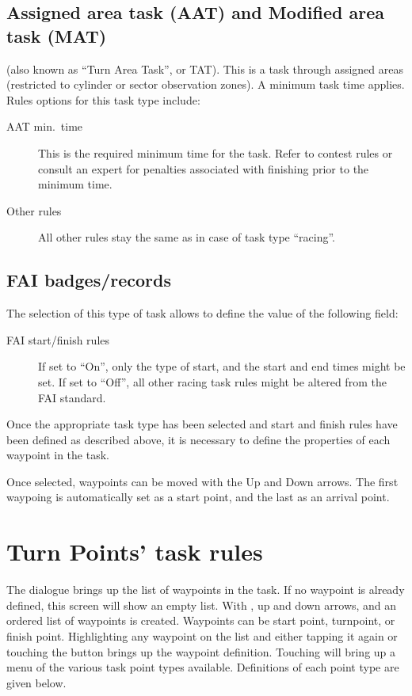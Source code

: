 \subsection*{Assigned area task (AAT) and Modified area task (MAT)}
(also known as ``Turn Area Task'', or TAT).  This is a task through assigned
areas (restricted to cylinder or sector observation zones).  A minimum task time 
applies.  
Rules options for this task type include:
  \begin{description}
  \item [AAT min.\ time]  This is the required minimum time for the task.  Refer
    to contest rules or consult an expert for penalties associated with finishing 
    prior to the minimum time.
  \item [Other rules] All other rules stay the same as in case of task type 
    ``racing''.
  \end{description}


\subsection*{FAI badges/records}
The selection of this type of task allows to define the value of the following field: 
  \begin{description}
  \item [FAI start/finish rules] If set to ``On'', only the type of start, and the start and end times might be set. 
  If set to ``Off'', all other racing task rules might be altered from the FAI standard.
  \end{description}

Once the appropriate task type has been selected and start and finish rules 
have been defined as described above, it is necessary to define the properties 
of each waypoint in the task.  

Once selected, waypoints can be moved with the Up and Down arrows.
The first waypoing is automatically set as a start point, and the last as an arrival point.

\section{Turn Points' task rules}\label{sec:task-rules}

The  dialogue brings up the list of waypoints in the task. 
 If no waypoint is already defined, this screen 
will show an empty list. With , up and down arrows, and 
 an ordered list of waypoints is created. 
Waypoints can be start point, turnpoint, or finish point.
Highlighting any waypoint on the list and either tapping it again or 
touching the  button brings up the waypoint definition. 
Touching  will bring up a menu of the various task point 
types available.  Definitions of each point type are given below.

